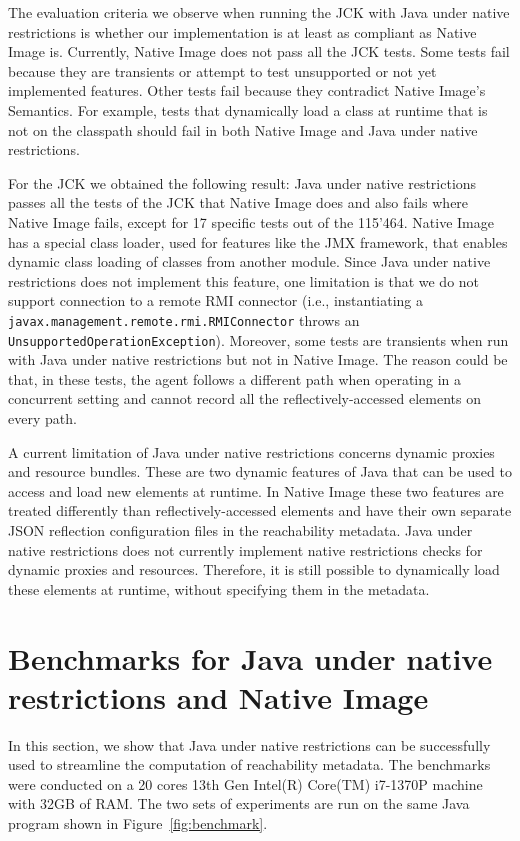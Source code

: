 The evaluation criteria we observe when running the JCK with Java under native restrictions is whether our implementation is at least as compliant as Native Image is. Currently, Native Image does not pass all the JCK tests. Some tests fail because they are transients or attempt to test unsupported or not yet implemented features. Other tests fail because they contradict Native Image's Semantics. For example, tests that dynamically load a class at runtime that is not on the classpath should fail in both Native Image and Java under native restrictions. 

For the JCK we obtained the following result: Java under native restrictions passes all the tests of the JCK that Native Image does and also fails where Native Image fails, except for 17 specific tests out of the 115'464. Native Image has a special class loader, used for features like the JMX framework, that enables dynamic class loading of classes from another module. Since Java under native restrictions does not implement this feature, one limitation is that we do not support connection to a remote RMI connector (i.e., instantiating a \verb|javax.management.remote.rmi.RMIConnector| throws an \verb|UnsupportedOperationException|). 
Moreover, some tests are transients when run with Java under native restrictions but not in Native Image. The reason could be that, in these tests, the agent follows a different path when operating in a concurrent setting and cannot record all the reflectively-accessed elements on every path. 

A current limitation of Java under native restrictions concerns dynamic proxies and resource bundles. These are two dynamic features of Java that can be used to access and load new elements at runtime. In Native Image these two features are treated differently than reflectively-accessed elements and have their own separate JSON reflection configuration files in the reachability metadata. Java under native restrictions does not currently implement native restrictions checks for dynamic proxies and resources. Therefore, it is still possible to dynamically load these elements at runtime, without specifying them in the metadata. 

\section{Benchmarks for Java under native restrictions and Native Image}\label{benchmark}
In this section, we show that Java under native restrictions can be successfully used to streamline the computation of reachability metadata. The benchmarks were conducted on a 20 cores 13th Gen Intel(R) Core(TM) i7-1370P machine with 32GB of RAM. The two sets of experiments are run on the same Java program shown in Figure~\ref{fig:benchmark}. 

